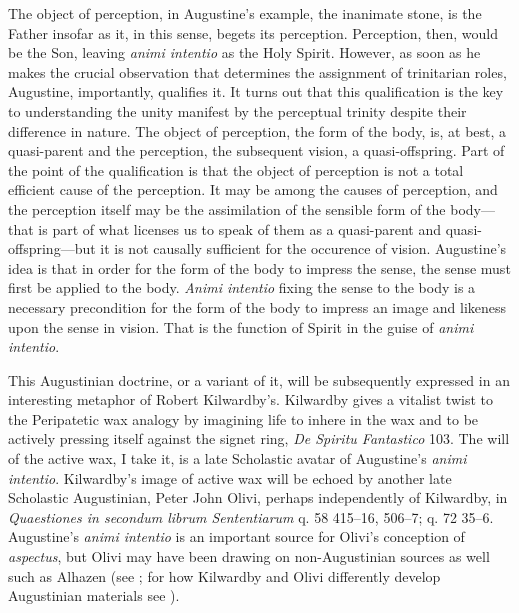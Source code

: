 \documentclass[12pt]{article}
\begin{document}
The object of perception, in Augustine's example, the inanimate stone, is the Father insofar as it, in this sense, begets its perception. Perception, then, would be the Son, leaving \emph{animi intentio} as the Holy Spirit. However, as soon as he makes the crucial observation that determines the assignment of trinitarian roles, Augustine, importantly, qualifies it. It turns out that this qualification is the key to understanding the unity manifest by the perceptual trinity despite their difference in nature. The object of perception, the form of the body, is, at best, a quasi-parent and the perception, the subsequent vision, a quasi-offspring. Part of the point of the qualification is that the object of perception is not a total efficient cause of the perception. It may be among the causes of perception, and the perception itself may be the assimilation of the sensible form of the body---that is part of what licenses us to speak of them as a quasi-parent and quasi-offspring---but it is not causally sufficient for the occurence of vision. Augustine's idea is that in order for the form of the body to impress the sense, the sense must first be applied to the body. \emph{Animi intentio} fixing the sense to the body is a necessary precondition for the form of the body to impress an image and likeness upon the sense in vision. That is the function of Spirit in the guise of \emph{animi intentio}. 

This Augustinian doctrine, or a variant of it, will be subsequently expressed in an interesting metaphor of Robert Kilwardby's. Kilwardby gives a vitalist twist to the Peripatetic wax analogy by imagining life to inhere in the wax and to be actively pressing itself against the signet ring, \emph{De Spiritu Fantastico} 103. The will of the active wax, I take it, is a late Scholastic avatar of Augustine's \emph{animi intentio}. Kilwardby's image of active wax will be echoed by another late Scholastic Augustinian, Peter John Olivi, perhaps independently of Kilwardby, in \emph{Quaestiones in secondum librum Sententiarum} q. 58 415–16, 506–7; q. 72 35–6. Augustine's \emph{animi intentio} is an important source for Olivi's conception of \emph{aspectus}, but Olivi may have been drawing on non-Augustinian sources as well such as Alhazen (see \citealt[41 especially n. 43]{Tachau:1988aa}; for how Kilwardby and Olivi differently develop Augustinian materials see \citealt{Silva:2010zh}).
\end{document}
